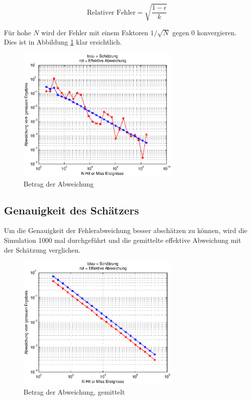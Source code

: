 \documentclass{book}
\begin{document}
\begin{refsection}
\begin{equation}
	\text{Relativer Fehler} = \sqrt{\frac{1-\epsilon}{k}} 
	\label{equ:relativer_Fehler}
\end{equation}

Für hohe $N$ wird der Fehler mit einem Faktoren $1 / \sqrt{N}$ gegen $0$ konvergieren. Dies ist in Abbildung \ref{fig:Fehler} klar ersichtlich.

\begin{figure}[ht!]
    \centering
    \includegraphics[width=8cm]{images/Fehler.eps}
    \caption{Betrag der Abweichung}
    \label{fig:Fehler}
\end{figure}


\subsection{Genauigkeit des Schätzers}

Um die Genauigkeit der Fehlerabweichung besser abschätzen zu können, wird die Simulation 1000 mal durchgeführt und die gemittelte effektive Abweichung mit der Schätzung verglichen.\\

\begin{figure}[ht!]
    \centering
    \includegraphics[width=8cm]{images/Fehler_gemittelt.eps}
    \caption{Betrag der Abweichung, gemittelt}
    \label{fig:Fehler_gemittelt}
\end{figure}


\end{refsection}
\end{document}
